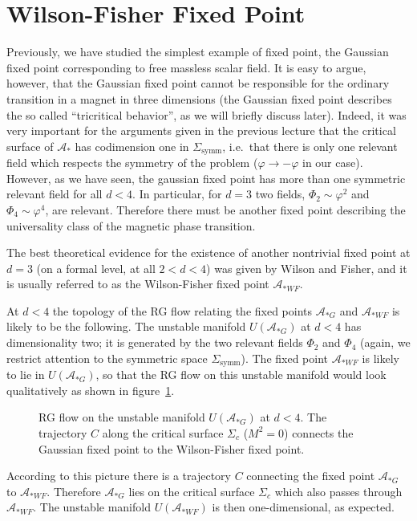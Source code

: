 \section{Wilson-Fisher Fixed Point}

Previously, we have studied the simplest example of fixed point, the Gaussian
fixed point corresponding to free massless scalar field. It is easy to argue,
however, that the Gaussian fixed point cannot be responsible for the ordinary
transition in a magnet in three dimensions (the Gaussian fixed point describes the
so called ``tricritical behavior'', as we will briefly discuss later). Indeed, it
was very important for the arguments given in the previous lecture that the
critical surface of $\mathcal A_*$ has codimension one in $\Sigma_{\text{symm}}$,
i.e.\ that there is only one relevant field which respects the symmetry of the
problem ($\varphi\to-\varphi$ in our case). However, as we have seen, the gaussian
fixed point has more than one symmetric relevant field for all $d<4$. In
particular, for $d=3$ two fields, $\Phi_2\sim\varphi^2$ and $\Phi_4\sim\varphi^4$,
are relevant. Therefore there must be another fixed point describing the
universality class of the magnetic phase transition.

The best theoretical evidence for the existence of another nontrivial fixed point
at $d=3$ (on a formal level, at all $2<d<4$) was given by Wilson and Fisher, and
it is usually referred to as the Wilson-Fisher fixed point $\mathcal A_{*WF}$.

At $d<4$ the topology of the RG flow relating the fixed points $\mathcal A_{*G}$
and $\mathcal A_{*WF}$ is likely to be the following. The unstable manifold
$U(\mathcal A_{*G})$ at $d<4$ has dimensionality two; it is generated by the two
relevant fields $\Phi_2$ and $\Phi_4$ (again, we restrict attention to the
symmetric space $\Sigma_{\text{symm}}$). The fixed point $\mathcal A_{*WF}$ is
likely to lie in $U(\mathcal A_{*G})$, so that the RG flow on this unstable
manifold would look qualitatively as shown in figure~\ref{fig:wfflow}.
\begin{figure}[ht]
\centering{}
\caption{RG flow on the unstable manifold $U(\mathcal A_{*G})$ at $d<4$. The
trajectory $C$ along the critical surface $\Sigma_c$ ($M^2=0$) connects the
Gaussian fixed point to the Wilson-Fisher fixed point.}
\label{fig:wfflow}
\end{figure}

According to this picture there is a trajectory $C$ connecting the fixed point
$\mathcal A_{*G}$ to $\mathcal A_{*WF}$. Therefore $\mathcal A_{*G}$ lies on the
critical surface $\Sigma_c$ which also passes through $\mathcal A_{*WF}$. The
unstable manifold $U(\mathcal A_{*WF})$ is then one-dimensional, as expected.

